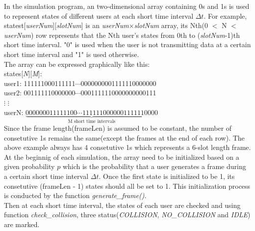 \documentclass[11pt,a4paper]{report}
\begin{document}
In the simulation program, an two-dimensional array containing 0s and 1s is used to represent states of different users at each short time interval \(\Delta t\). For example, statest[\emph{userNum}][\emph{slotNum}] is an \emph{userNum}\(\times\)\emph{slotNum} array, its Nth(0 \(<\) N \(<\) \emph{userNum}) row represents that the Nth user's states from 0th to (\emph{slotNum}-1)th short time interval. "0" is used when the user is not transmitting data at a certain short time interval and "1" is used otherwise. \\

The array can be expressed graphically like this: \\

states[\emph{N}][\emph{M}]: \\

\qquad user1: 111111000111111\(\cdots\)0000000001111110000000 \\

\qquad user2: 001111110000000\(\cdots\)0001111110000000000111 \\

\qquad\quad \(\vdots\) \hspace{35mm} \(\vdots\) \\

\qquad userN: \hspace{-0.5mm}\(\underbrace{000000011111100\cdots1111110000001111110000}_\text{M short time intervals}\) \\

Since the frame length(frameLen) is assumed to be constant, the number of consetutive 1s remains the same(except the frames at the end of each row). The above example always has 4 consetutive 1s which represents a 6-slot length frame. \\

At the beginnig of each simulation, the array need to be initialized based on a given probability \(p\) which is the probability that a user generates a frame during a certain short time interval \(\Delta t\). Once the first state is initialized to be 1, its consetutive (frameLen - 1) states should all be set to 1. This initialization process is conducted by the function \emph{generate\_frame()}.\\

Then at each short time interval, the states of each user are checked and using function \emph{check\_collision}, three status(\emph{COLLISION}, \emph{NO\_COLLISION} and \emph{IDLE}) are marked. \\
\end{document}
